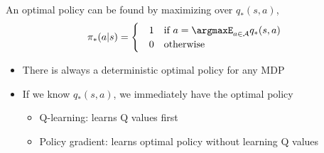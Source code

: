 An optimal policy can be found by maximizing over $q_*(s,a)$, 
\begin{align*}
	\pi_*(a|s) = 
	\begin{cases} 
		&1 \quad \textrm{if } a = \argmaxE_{a\in \mathcal{A}}q_*(s,a)\\
		&0 \quad \textrm{otherwise}
	\end{cases}
\end{align*}
\begin{itemize}
	\item There is always a deterministic optimal policy for any MDP
	\item If we know $q_*(s,a)$, we immediately have the optimal policy 
		\begin{itemize}
			\item Q-learning: learns Q values first
			\item Policy gradient: learns optimal policy without learning Q values
		\end{itemize}
\end{itemize}

